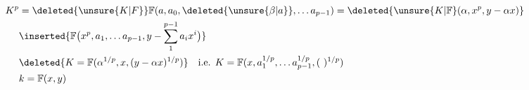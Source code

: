 \[ \begin{aligned}
K^p&=\deleted{\unsure{K|F}}\mathbb{F}(a,a_0,\deleted{\unsure{\beta|a}},\ldots a_{p-1})=\deleted{\unsure{K|\mathbb F}(\alpha,x^p,y-\alpha x)}\\
&\inserted{\mathbb{F}\bigl(x^p,a_1,\ldots a_{p-1},y-\sum_1^{p-1}a_i x^i\bigr)}\\
&\deleted{K=\mathbb{F}(\alpha^{1/p},x,(y-\alpha x)^{1/p})}\quad \text{i.e. } K=\mathbb{F}(x,a_1^{1/p},\ldots a_{p-1}^{1/p},(\ )^{1/p})\\
& k=\mathbb F(x,y)
\end{aligned} \]

\margin{[N.B. $x,\unsure{z|y}\in K$, \unsure{donc|d'où|et} $y=\alpha x+\beta\in K$, donc $k\subset K$}
